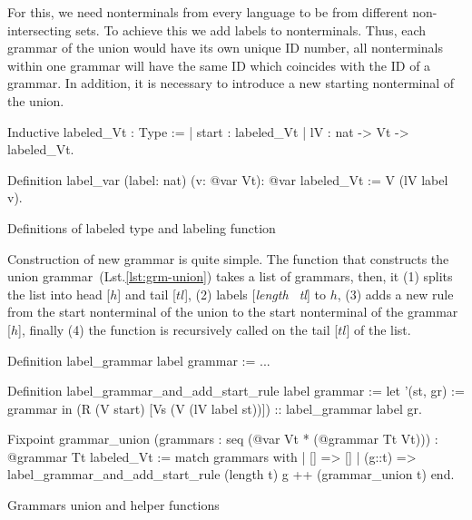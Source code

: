 For this, we need nonterminals from every language to be from different non-intersecting sets. To achieve this we add labels to nonterminals. Thus, each grammar of the union would have its own unique ID number, all nonterminals within one grammar will have the same ID which coincides with the ID of a grammar. In addition, it is necessary to introduce a new starting nonterminal of the union.

\begin{listing}[h]
    \begin{pyglist}[language=coq, numbers=none, numbersep=5pt]
  Inductive labeled_Vt : Type :=
  | start : labeled_Vt
  | lV : nat -> Vt -> labeled_Vt.
  
  Definition label_var (label: nat) 
                       (v: @var Vt): @var 
                       labeled_Vt :=
    V (lV label v).  
    \end{pyglist}
    \caption{Definitions of labeled type and labeling function}
    \label{lst:verbments1}
\end{listing}

Construction of new grammar is quite simple. The function that constructs the union grammar~(Lst.\ref{lst:grm-union}) takes a list of grammars, then, it (1) splits the list into head [$h$] and tail [$tl$], (2) labels [\textit{length \ tl}] to $h$, (3) adds a new rule from the start nonterminal of the union to the start nonterminal of the grammar [$h$], finally (4) the function is recursively called on the tail [$tl$] of the list.

\begin{listing}[h]
    \begin{pyglist}[language=coq, numbers=none, numbersep=5pt]
  Definition label_grammar label grammar := ...

  Definition label_grammar_and_add_start_rule 
               label 
               grammar :=
    let '(st, gr) := grammar in 
    (R (V start) [Vs (V (lV label st))]) 
       :: label_grammar label gr.        

  Fixpoint grammar_union 
     (grammars : seq (@var Vt * (@grammar Tt Vt)))
       : @grammar 
     Tt 
     labeled_Vt :=
    match grammars with
    |  [] => []
    |  (g::t) => 
         label_grammar_and_add_start_rule 
           (length t) 
           g ++ (grammar_union t)
    end.
    \end{pyglist}
    \caption{Grammars union and helper functions}
    \label{lst:grm-union}
\end{listing}

